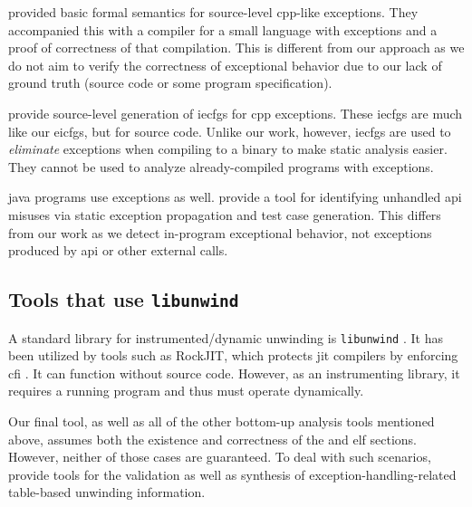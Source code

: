 \Textcite{hutton2004compiling} provided basic formal semantics for source-level \gls{cpp}-like exceptions.
They accompanied this with a compiler for a small language with exceptions and a proof of correctness of that compilation.
This is different from our approach as we do not aim to verify the correctness of exceptional behavior due to our lack of ground truth (source code or some program specification).

\Textcite{prabhu2011interprocedural} provide source-level generation of \acp{iecfg} for \gls{cpp} exceptions.
These \acp{iecfg} are much like our \acp{eicfg}, but for source code.
Unlike our work, however, \acp{iecfg} are used to \emph{eliminate} exceptions when compiling to a binary to make static analysis easier.
They cannot be used to analyze already-compiled programs with exceptions.

\Gls{java} programs use exceptions as well. \Textcite{kechagia2019misuse} provide a tool for identifying unhandled \ac{api} misuses via static exception propagation and test case generation. This differs from our work as we detect in-program exceptional behavior, not exceptions produced by \ac{api} or other external calls.

\subsection{Tools that use \texttt{libunwind}}
A standard library for instrumented/dynamic unwinding is \lstinline|libunwind| \autocite{libunwind}.
It has been utilized by tools such as RockJIT, which protects \ac{jit} compilers by enforcing \ac{cfi} \autocite{niu2014rockjit}.
It can function without source code. However, as an instrumenting library, it requires a running program and thus must operate dynamically.

Our final tool, as well as all of the other bottom-up analysis tools mentioned above, assumes both the existence and correctness of the  and  \ac{elf} sections.
However, neither of those cases are guaranteed.
To deal with such scenarios, \textcite{bastian2019dwarf} provide tools for the validation as well as synthesis of exception-handling-related table-based unwinding information.

%
%
%
%

